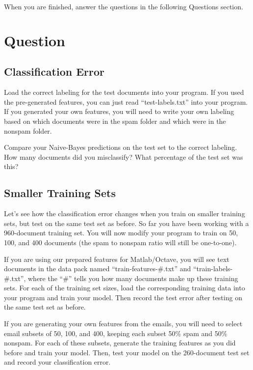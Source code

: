 \documentclass[10pt,a4paper]{article}
\begin{document}
  When you are finished, answer the questions in the following Questions section.


\section{Question}
%
  \subsection{Classification Error}
  Load the correct labeling for the test documents into your program. If you used the pre-generated features, you can just read ``test-labels.txt'' into your program. If you generated your own features, you will need to write your own labeling based on which documents were in the spam folder and which were in the nonspam folder.

  Compare your Naive-Bayes predictions on the test set to the correct labeling. How many documents did you misclassify? What percentage of the test set was this?


  \subsection{Smaller Training Sets}
  Let's see how the classification error changes when you train on smaller training sets, but test on the same test set as before. So far you have been working with a 960-document training set. You will now modify your program to train on 50, 100, and 400 documents (the spam to nonspam ratio will still be one-to-one).

  If you are using our prepared features for Matlab/Octave, you will see text documents in the data pack named ``train-features-\#.txt'' and ``train-labels-\#.txt'', where the ``\#'' tells you how many documents make up these training sets. For each of the training set sizes, load the corresponding training data into your program and train your model. Then record the test error after testing on the same test set as before.

  If you are generating your own features from the emails, you will need to select email subsets of 50, 100, and 400, keeping each subset 50\% spam and 50\% nonspam. For each of these subsets, generate the training features as you did before and train your model. Then, test your model on the 260-document test set and record your classification error.
\end{document}
